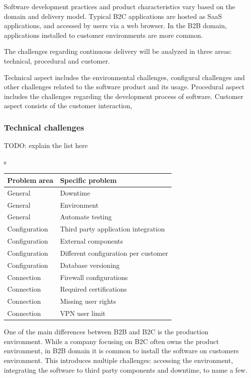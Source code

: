 \documentclass[english]{tktltiki2}
\theoremstyle{definition}
\theoremstyle{remark}
\begin{document}
Software development practices and product characteristics vary based on the domain and delivery model. Typical B2C applications are hosted as SaaS applications, and accessed by users via a web browser. In the B2B domain, applications installed to customer environments are more common. 

The challenges regarding continuous delivery will be analyzed in three areas: technical, procedural and customer. 

Technical aspect includes the environmental challenges, configural challenges and other challenges related to the software product and its usage. Procedural aspect includes the challenges regarding the development process of software. Customer aspect consists of the customer interaction, 

\subsubsection{Technical challenges}

TODO: explain the list here

\begin{center}s
    \begin{tabular}{ | l | p{5cm} |}
    \hline
    Problem area & Specific problem \\ \hline
    General & Downtime \\ \hline
    General & Environment \\ \hline
    General & Automate testing \\ \hline
    Configuration & Third party application integration \\ \hline
    Configuration & External components \\ \hline
    Configuration & Different configuration per customer \\ \hline
    Configuration & Database versioning \\ \hline
    Connection & Firewall configurations \\ \hline
    Connection & Required certifications \\ \hline
    Connection & Missing user rights \\ \hline
	Connection & VPN user limit \\ \hline
    \hline
    \end{tabular}
\end{center}

One of the main differences between B2B and B2C is the production environment. While a company focusing on B2C often owns the product environment, in B2B domain it is common to install the software on customers environment. This introduces multiple challenges: accessing the environment, integrating the software to third party components and downtime, to name a few. 
\end{document}
